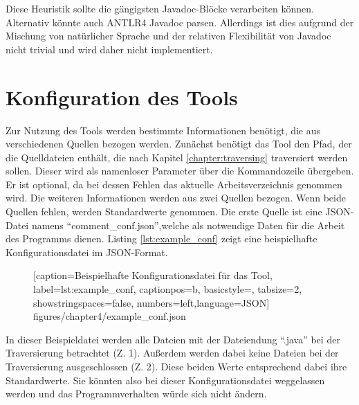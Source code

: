 Diese Heuristik sollte die gängigsten Javadoc-Blöcke verarbeiten können. Alternativ könnte auch ANTLR4 Javadoc parsen. Allerdings ist dies aufgrund der Mischung von natürlicher Sprache und der relativen Flexibilität von Javadoc nicht trivial und wird daher nicht implementiert. 



\section{Konfiguration des Tools}\label{chapter:conf}
Zur Nutzung des Tools werden bestimmte Informationen benötigt, die aus verschiedenen Quellen bezogen werden. Zunächst benötigt das Tool den Pfad, der die Quelldateien enthält, die nach Kapitel \ref{chapter:traversing} traversiert werden sollen. Dieser wird als namenloser Parameter über die Kommandozeile übergeben. Er ist optional, da bei dessen Fehlen das aktuelle Arbeitsverzeichnis genommen wird. Die weiteren Informationen werden aus zwei Quellen bezogen. Wenn beide Quellen fehlen, werden Standardwerte genommen. Die erste Quelle ist eine \ac{JSON}-Datei namens \enquote{comment\_conf.json},welche als notwendige Daten für die Arbeit des Programms dienen. Listing \ref{lst:example_conf} zeigt eine beispielhafte Konfigurationsdatei im \ac{JSON}-Format.

\begin{figure}[htbp]

[caption={Beispielhafte Konfigurationsdatei für das Tool},
label={lst:example_conf},
captionpos=b, basicstyle=\footnotesize, tabsize=2, showstringspaces=false,  numbers=left,language=JSON]
{figures/chapter4/example_conf.json}
\end{figure}

In dieser Beispieldatei  werden alle Dateien mit der Dateiendung \enquote{.java} bei der Traversierung betrachtet (Z. 1). Außerdem werden dabei keine Dateien bei der Traversierung ausgeschlossen (Z. 2). Diese beiden Werte entsprechend dabei ihre Standardwerte. Sie könnten also bei dieser Konfigurationsdatei weggelassen werden und das Programmverhalten würde sich nicht ändern.

